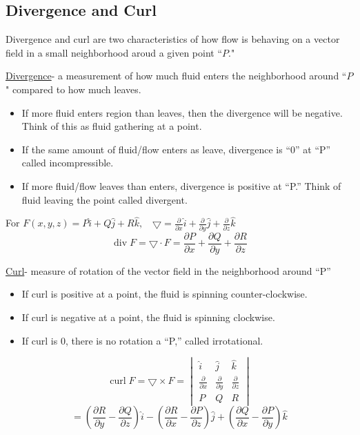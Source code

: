 \documentclass[12pt]{article}
\numberwithin{equation}{subsection}
\newcommand{\parx}[1]{\frac{\partial #1}{\partial x}}
\newcommand{\pary}[1]{\frac{\partial #1}{\partial y}}
\newcommand{\parz}[1]{\frac{\partial #1}{\partial z}}
\DeclareMathOperator{\vdiv}{div}
\DeclareMathOperator{\vcurl}{curl}
\begin{document}
\begin{flushleft}
\subsection{Divergence and Curl}
Divergence and curl are two characteristics of how flow is behaving on a vector field in a small neighborhood aroud a given point ``$P$."

\bigskip
\noindent \underline{Divergence}- a measurement of how much fluid enters the neighborhood around ``$P$" compared to how much leaves. \\

\begin{itemize}
\item If more fluid enters region than leaves, then the divergence will be negative. Think of this as fluid gathering at a  point. 
\item If the same amount of fluid/flow enters as leave, divergence is ``0'' at ``P'' called incompressible.
\item If more fluid/flow leaves than enters, divergence is positive at ``P.'' Think of fluid leaving the point called divergent.
\end{itemize}

For $F(x,y,z) = P\hat{i} + Q\hat{j} + R\hat{k}, \ \ \ \ \bigtriangledown = \parx{}\hat{i} + \pary{}\hat{j} + \parz{}\hat{k}$
\begin{equation}
\vdiv F = \bigtriangledown \cdot F = \parx{P} + \pary{Q} + \parz{R}
\end{equation}

\noindent \underline{Curl}- measure of rotation of the vector field in the neighborhood around ``P''

\begin{itemize}
\item If curl is positive at a point, the fluid is spinning counter-clockwise.
\item If curl is negative at a point, the fluid is spinning clockwise.
\item If curl is 0, there is no rotation a ``P,'' called irrotational.
\end{itemize}

\begin{equation}
\vcurl F = \bigtriangledown \times F = \begin{vmatrix}
\hat{i} & \hat{j} & \hat{k} \\
\parx{} & \pary{} & \parz{} \\
P & Q & R
\end{vmatrix}
\end{equation}
\begin{equation}
= \left( \pary{R} - \parz{Q} \right)\hat{i} - \left( \parx{R} - \parz{P} \right)\hat{j} + \left( \parx{Q} - \pary{P} \right)\hat{k}
\end{equation}


\end{flushleft}
\end{document}

